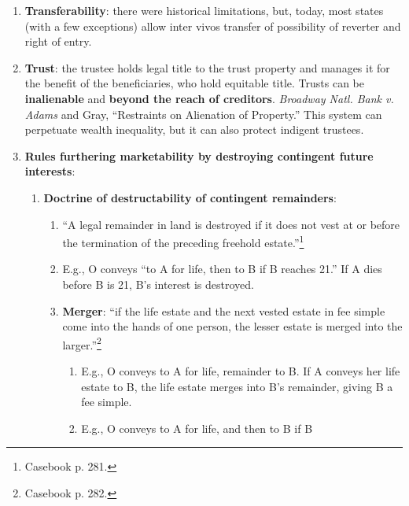 \begin{enumerate}
\begin{enumerate}
        \item \textbf{Executory interest vs. remainder}: ``The difference 
        between taking possession as soon as the prior estate ends and 
        divesting the prior estate is the essential difference between a 
        remainder and an executory interest.''\footnote{Casebook p. 259.}
    \end{enumerate}
    \item \textbf{Transferability}: there were historical limitations, but, 
    today, most states (with a few exceptions) allow inter vivos transfer of 
    possibility of reverter and right of entry. %
    \item \textbf{Trust}: the trustee holds legal title to the trust property 
    and manages it for the benefit of the beneficiaries, who hold equitable 
    title. Trusts can be \textbf{inalienable} and \textbf{beyond the reach of 
    creditors}. \emph{Broadway Natl. Bank v. Adams} and Gray, ``Restraints on 
    Alienation of Property.'' This system can perpetuate wealth inequality, 
    but it can also protect indigent trustees.
    \item \textbf{Rules furthering marketability by destroying contingent 
    future interests}:
    \begin{enumerate}
        \item \textbf{Doctrine of destructability of contingent remainders}:
        \begin{enumerate}
            \item ``A legal remainder in land is destroyed if it does not vest 
            at or before the termination of the preceding freehold 
            estate.''\footnote{Casebook p. 281.}
            \item E.g., O conveys ``to A for life, then to B if B reaches 
            21.'' If A dies before B is 21, B's interest is destroyed.
            \item \textbf{Merger}: ``if the life estate and the next vested 
            estate in fee simple come into the hands of one person, the lesser 
            estate is merged into the larger.''\footnote{Casebook p. 282.}
            \begin{enumerate}
                \item E.g., O conveys to A for life, remainder to B. If A 
                conveys her life estate to B, the life estate merges into B's 
                remainder, giving B a fee simple.
                \item E.g., O conveys to A for life, and then to B if B 

\end{enumerate}
\end{enumerate}
\end{enumerate}
\end{enumerate}
